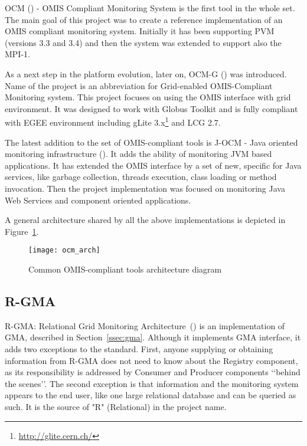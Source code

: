 OCM (\cite{RWspdt98, RW:ppam99b}) - OMIS Compliant Monitoring System is the first tool in the whole set. The main goal of this project was to create a reference implementation of an OMIS compliant monitoring system. Initially it has been supporting PVM (versions 3.3 and 3.4) and then the system was extended to support also the MPI-1.

As a next step in the platform evolution, later on, OCM-G (\cite{axgrid03b}) was introduced. Name of the project is an abbreviation for Grid-enabled OMIS-Compliant Monitoring system. This project focuses on using the OMIS interface with grid environment. It was designed to work with Globus Toolkit and is fully compliant with EGEE environment including gLite 3.x\footnote{\url{http://glite.cern.ch/}} and LCG 2.7.

The latest addition to the set of OMIS-compliant tools is J-OCM - Java oriented monitoring infrastructure (\cite{jocm}). It adds the ability of monitoring JVM based applications. It has extended the OMIS interface by a set of new, specific for Java services, like garbage collection, threads execution, class loading or method invocation. Then the project implementation was focused on monitoring Java Web Services and component oriented applications.

A general architecture shared by all the above implementations is depicted in Figure~\ref{fig:ocmg}.

\begin{figure}[ht]

\centering

\texttt{[image: ocm\_arch]} \caption{Common OMIS-compliant tools architecture diagram} \label{fig:ocmg}

\end{figure}


\subsection{R-GMA}

R-GMA: Relational Grid Monitoring Architecture~(\cite{RGMA1,RGMA2,RGMA3}) is an implementation of GMA, described in Section~\ref{ssec:gma}. Although it implements GMA interface, it adds two exceptions to the standard. First, anyone supplying or obtaining information from R-GMA does not need to know about the Registry component, as its responsibility is addressed by Consumer and Producer components \lq\lq{}behind the scenes\rq\rq{}. The second exception is that information and the monitoring system appears to the end user, like one large relational database and can be queried as such. It is the source of "R" (Relational) in the project name.


